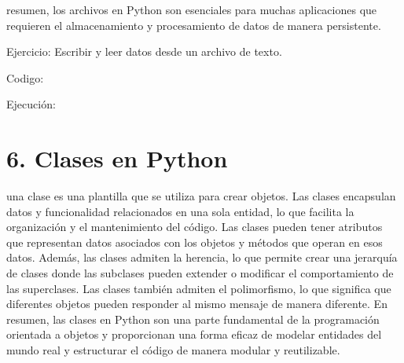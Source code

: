 \documentclass[a4paper]{article}
\begin{document}
\pagestyle{Convertedv}
{
resumen, los archivos en Python son esenciales para muchas aplicaciones que requieren el almacenamiento y procesamiento
de datos de manera persistente.}

{
Ejercicio: Escribir y leer datos desde un archivo de texto.}

\begin{center}
\end{center}
{
Codigo:}

{
Ejecución:}

\begin{center}
\end{center}
\begin{center}
\end{center}

\bigskip


\bigskip


\bigskip

\section{6. Clases en Python}

\bigskip

{
una clase es una plantilla que se utiliza para crear objetos. Las clases encapsulan datos y funcionalidad relacionados
en una sola entidad, lo que facilita la organización y el mantenimiento del código. Las clases pueden tener atributos
que representan datos asociados con los objetos y métodos que operan en esos datos. Además, las clases admiten la
herencia, lo que permite crear una jerarquía de clases donde las subclases pueden extender o modificar el
comportamiento de las superclases. Las clases también admiten el polimorfismo, lo que significa que diferentes objetos
pueden responder al mismo mensaje de manera diferente. En resumen, las clases en Python son una parte fundamental de la
programación orientada a objetos y proporcionan una forma eficaz de modelar entidades del mundo real y estructurar el
código de manera modular y reutilizable.}
\end{document}
